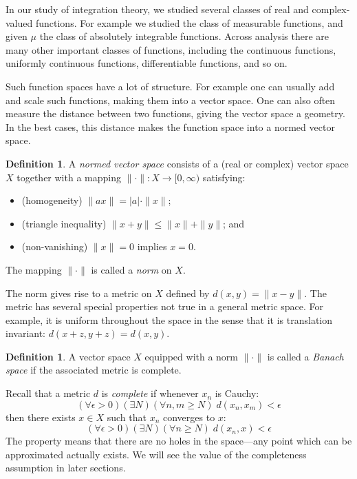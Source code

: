 \documentclass[11pt,oneside]{amsbook}
\theoremstyle{definition}
\theoremstyle{plain}
\theoremstyle{definition}
\newtheorem{defn}[thm]{Definition}
\theoremstyle{remark}
\numberwithin{equation}{section}
\numberwithin{figure}{section}
\begin{document}
In our study of integration theory, we studied several classes of real and complex-valued functions. For example we studied the class of measurable functions, and given $\mu$ the class of absolutely integrable functions. Across analysis there are many other important classes of functions, including the continuous functions, uniformly continuous functions, differentiable functions, and so on.

Such function spaces have a lot of structure. For example one can usually add and scale such functions, making them into a vector space. One can also often measure the distance between two functions, giving the vector space a geometry. In the best cases, this distance makes the function space into a normed vector space.

\begin{defn}
  A \emph{normed vector space} consists of a (real or complex) vector space $X$ together with a mapping $\|\cdot\|\colon X\to[0,\infty)$ satisfying:
  \begin{itemize}
  \item (homogeneity) $\|ax\|=|a|\cdot\|x\|$;
  \item (triangle inequality) $\|x+y\|\leq\|x\|+\|y\|$; and
  \item (non-vanishing) $\|x\|=0$ implies $x=0$.
  \end{itemize}
  The mapping $\|\cdot\|$ is called a \emph{norm} on $X$.
\end{defn}

The norm gives rise to a metric on $X$ defined by $d(x,y)=\|x-y\|$. The metric has several special properties not true in a general metric space. For example, it is uniform throughout the space in the sense that it is translation invariant: $d(x+z,y+z)=d(x,y)$.

\begin{defn}
  A vector space $X$ equipped with a norm $\|\cdot\|$ is called a \emph{Banach space} if the associated metric is complete.
\end{defn}

Recall that a metric $d$ is \emph{complete} if whenever $x_n$ is Cauchy:
\[(\forall\epsilon>0)(\exists N)(\forall n,m\geq N)\;d(x_n,x_m)<\epsilon
\]
then there exists $x\in X$ such that $x_n$ converges to $x$:
\[(\forall\epsilon>0)(\exists N)(\forall n\geq N)\;d(x_n,x)<\epsilon
\]
The property means that there are no holes in the space---any point which can be approximated actually exists. We will see the value of the completeness assumption in later sections.
\end{document}
